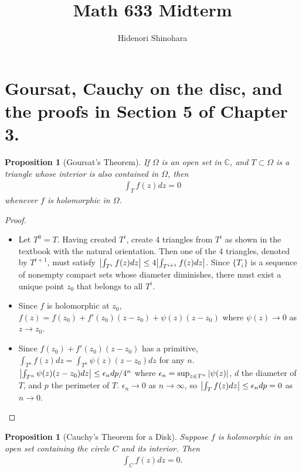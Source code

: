 \documentclass[12pt, psamsfonts]{amsart}
\newtheorem{prop}[thm]{Proposition}
\theoremstyle{definition}
\theoremstyle{remark}
\numberwithin{equation}{section}
\begin{document}
\title{Math 633 Midterm}
\author{Hidenori Shinohara}
\maketitle

\section{Goursat, Cauchy on the disc, and the proofs in Section 5 of Chapter 3.}

\begin{prop}[Goursat's Theorem]
  If $\Omega$ is an open set in $\mathbb{C}$, and $T \subset \Omega$ is a triangle whose interior is also contained in $\Omega$, then
  \begin{align*}
    \int_{T} f(z) dz = 0
  \end{align*}
  whenever $f$ is holomorphic in $\Omega$.
\end{prop}

\begin{proof}
$ $
  \begin{itemize}
    \item
      Let $T^0 = T$.
      Having created $T^i$, create 4 triangles from $T^i$ as shown in the textbook with the natural orientation.
      Then one of the 4 triangles, denoted by $T^{i + 1}$, must satisfy $\abs{\int_{T^i} f(z)dz} \leq 4\abs{\int_{T^{i + 1}} f(z)dz}$.
      Since $\{ T_i \}$ is a sequence of nonempty compact sets whose diameter diminishes, there must exist a unique point $z_0$ that belongs to all $T^i$.
    \item
      Since $f$ is holomorphic at $z_0$, $f(z) = f(z_0) + f'(z_0)(z - z_0) + \psi(z)(z - z_0)$ where $\psi(z) \rightarrow 0$ as $z \rightarrow z_0$.
    \item
      Since $f(z_0) + f'(z_0)(z - z_0)$ has a primitive, $\int_{T^n} f(z)dz = \int_{T^n}\psi(z)(z - z_0)dz$ for any $n$.
      $\abs{\int_{T^n}\psi(z)(z - z_0)dz} \leq \epsilon_ndp / 4^n$ where $\epsilon_n = \sup_{z \in T^n} \abs{\psi(z)}$, $d$ the diameter of $T$, and $p$ the perimeter of $T$.
      $\epsilon_n \rightarrow 0$ as $n \rightarrow \infty$, so $\abs{\int_{T} f(z)dz} \leq \epsilon_ndp = 0$ as $n \rightarrow 0$.
  \end{itemize}
\end{proof}

\begin{prop}[Cauchy's Theorem for a Disk]
  Suppose $f$ is holomorphic in an open set containing the circle $C$ and its interior.
  Then
  \begin{align*}
    \int_C f(z) dz = 0.
  \end{align*}
\end{prop}
\end{document}
